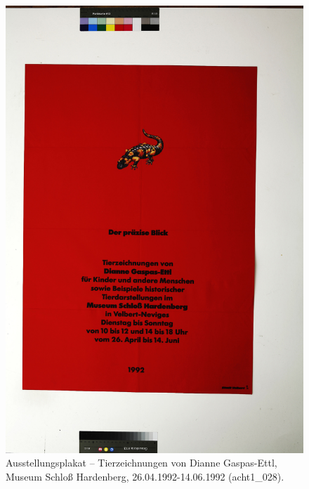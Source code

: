 \documentclass[a4paper,12pt,ngerman]{article}
\begin{document}
\begin{figure}[ht]
\includegraphics[width=\linewidth]{Abbildung_1_(acht1_028)}
\centering
\caption{Ausstellungsplakat – Tierzeichnungen von Dianne Gaspas-Ettl, Museum Schloß Hardenberg, 26.04.1992-14.06.1992 (acht1\_028).}
\end{figure}
\end{document}
